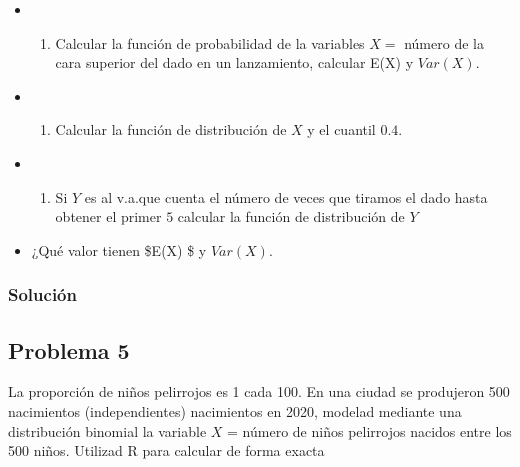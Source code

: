 \documentclass[
]{article}
\providecommand{\tightlist}{%
  \setlength{\itemsep}{0pt}\setlength{\parskip}{0pt}}
\begin{document}
\begin{itemize}
\item
  \begin{enumerate}
  \def\labelenumi{\alph{enumi})}
  \tightlist
  \item
    Calcular la función de probabilidad de la variables \(X=\) número de
    la cara superior del dado en un lanzamiento, calcular E(X) y
    \(Var(X)\).
  \end{enumerate}
\item
  \begin{enumerate}
  \def\labelenumi{\alph{enumi})}
  \setcounter{enumi}{1}
  \tightlist
  \item
    Calcular la función de distribución de \(X\) y el cuantil \(0.4\).
  \end{enumerate}
\item
  \begin{enumerate}
  \def\labelenumi{\alph{enumi})}
  \setcounter{enumi}{2}
  \tightlist
  \item
    Si \(Y\) es al v.a.que cuenta el número de veces que tiramos el dado
    hasta obtener el primer \(5\) calcular la función de distribución de
    \(Y\)
  \end{enumerate}
\item
  ¿Qué valor tienen \$E(X) \$ y \(Var(X)\).
\end{itemize}

\hypertarget{soluciuxf3n-3}{%
\subsubsection{Solución}\label{soluciuxf3n-3}}

\hypertarget{problema-5}{%
\subsection{Problema 5}\label{problema-5}}

La proporción de niños pelirrojos es 1 cada 100. En una ciudad se
produjeron 500 nacimientos (independientes) nacimientos en 2020, modelad
mediante una distribución binomial la variable \(X\) = número de niños
pelirrojos nacidos entre los 500 niños. Utilizad R para calcular de
forma exacta
\end{document}
